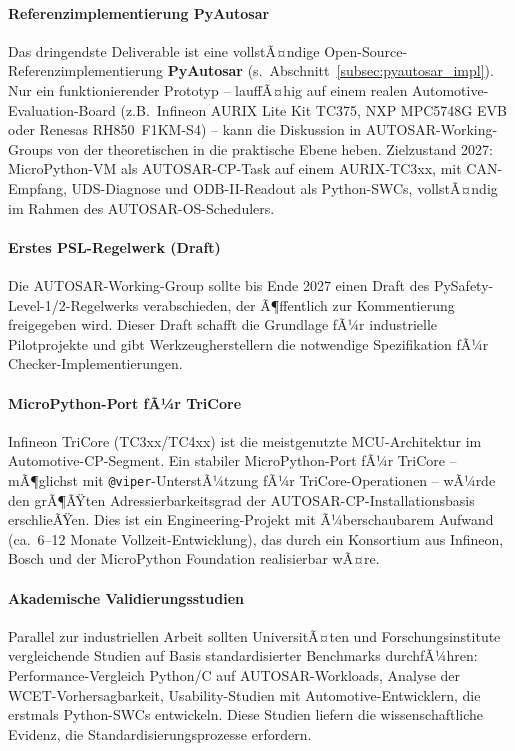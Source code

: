 ﻿\documentclass[12pt,a4paper,twoside]{article}
\begin{document}
\paragraph{Referenzimplementierung PyAutosar}
Das dringendste Deliverable ist eine vollstÃ¤ndige Open-Source-Referenzimplementierung
\textbf{PyAutosar} (s.~Abschnitt~\ref{subsec:pyautosar_impl}).
Nur ein funktionierender Prototyp -- lauffÃ¤hig auf einem realen Automotive-Evaluation-Board
(z.B.\ Infineon AURIX Lite Kit TC375, NXP MPC5748G EVB oder Renesas RH850~F1KM-S4) --
kann die Diskussion in AUTOSAR-Working-Groups von der theoretischen
in die praktische Ebene heben.
Zielzustand 2027: MicroPython-VM als AUTOSAR-CP-Task auf einem
AURIX-TC3xx, mit CAN-Empfang, UDS-Diagnose und ODB-II-Readout
als Python-SWCs, vollstÃ¤ndig im Rahmen des AUTOSAR-OS-Schedulers.

\paragraph{Erstes PSL-Regelwerk (Draft)}
Die AUTOSAR-Working-Group sollte bis Ende 2027 einen Draft des
PySafety-Level-1/2-Regelwerks verabschieden, der Ã¶ffentlich zur Kommentierung
freigegeben wird. Dieser Draft schafft die Grundlage fÃ¼r industrielle Pilotprojekte
und gibt Werkzeugherstellern die notwendige Spezifikation fÃ¼r
Checker-Implementierungen.

\paragraph{MicroPython-Port fÃ¼r TriCore}
Infineon TriCore (TC3xx/TC4xx) ist die meistgenutzte MCU-Architektur
im Automotive-CP-Segment. Ein stabiler MicroPython-Port fÃ¼r TriCore --
mÃ¶glichst mit \texttt{@viper}-UnterstÃ¼tzung fÃ¼r TriCore-Operationen --
wÃ¼rde den grÃ¶ÃŸten Adressierbarkeitsgrad der AUTOSAR-CP-Installationsbasis
erschlieÃŸen.
Dies ist ein Engineering-Projekt mit Ã¼berschaubarem Aufwand (ca.\ 6--12 Monate
Vollzeit-Entwicklung), das durch ein Konsortium aus Infineon,
Bosch und der MicroPython Foundation realisierbar wÃ¤re.

\paragraph{Akademische Validierungsstudien}
Parallel zur industriellen Arbeit sollten UniversitÃ¤ten und Forschungsinstitute
vergleichende Studien auf Basis standardisierter Benchmarks durchfÃ¼hren:
Performance-Vergleich Python/C auf AUTOSAR-Workloads, Analyse der
WCET-Vorhersagbarkeit, Usability-Studien mit Automotive-Entwicklern,
die erstmals Python-SWCs entwickeln.
Diese Studien liefern die wissenschaftliche Evidenz,
die Standardisierungsprozesse erfordern.
\end{document}
